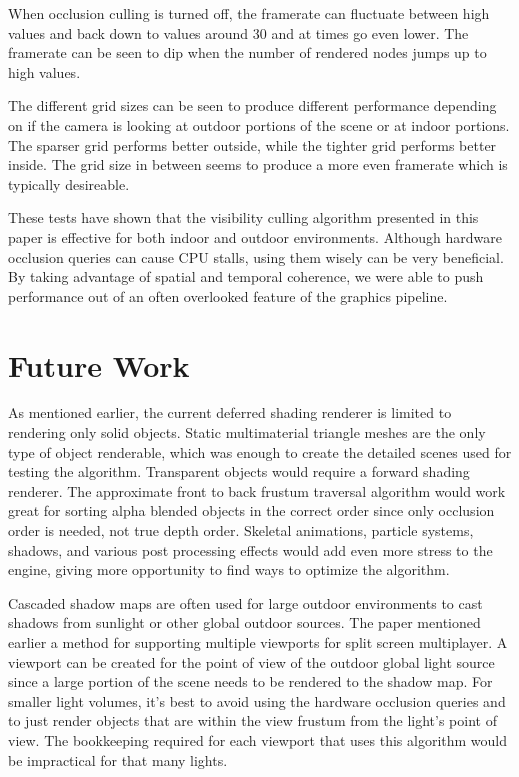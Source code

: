 \documentclass[12pt]{ucthesis}
\begin{document}
When occlusion culling is turned off, the framerate can fluctuate between high values and back down to values around 30 and at times go even lower.
The framerate can be seen to dip when the number of rendered nodes jumps up to high values.

The different grid sizes can be seen to produce different performance depending on if the camera is looking at outdoor portions of the scene or at indoor portions.
The sparser grid performs better outside, while the tighter grid performs better inside.
The grid size in between seems to produce a more even framerate which is typically desireable.

These tests have shown that the visibility culling algorithm presented in this paper is effective for both indoor and outdoor environments.
Although hardware occlusion queries can cause CPU stalls, using them wisely can be very beneficial.
By taking advantage of spatial and temporal coherence, we were able to push performance out of an often overlooked feature of the graphics pipeline.

\chapter{Future Work}
\label{future-work}
As mentioned earlier, the current deferred shading renderer is limited to rendering only solid objects.
Static multimaterial triangle meshes are the only type of object renderable, which was enough to create the detailed scenes used for testing the algorithm.
Transparent objects would require a forward shading renderer.
The approximate front to back frustum traversal algorithm would work great for sorting alpha blended objects in the correct order since only occlusion order is needed, not true depth order.
Skeletal animations, particle systems, shadows, and various post processing effects would add even more stress to the engine, giving more opportunity to find ways to optimize the algorithm.

Cascaded shadow maps are often used for large outdoor environments to cast shadows from sunlight or other global outdoor sources.\cite{ms-cascaded-shadow}
The paper mentioned earlier a method for supporting multiple viewports for split screen multiplayer.
A viewport can be created for the point of view of the outdoor global light source since a large portion of the scene needs to be rendered to the shadow map.
For smaller light volumes, it's best to avoid using the hardware occlusion queries and to just render objects that are within the view frustum from the light's point of view.
The bookkeeping required for each viewport that uses this algorithm would be impractical for that many lights.
\end{document}
